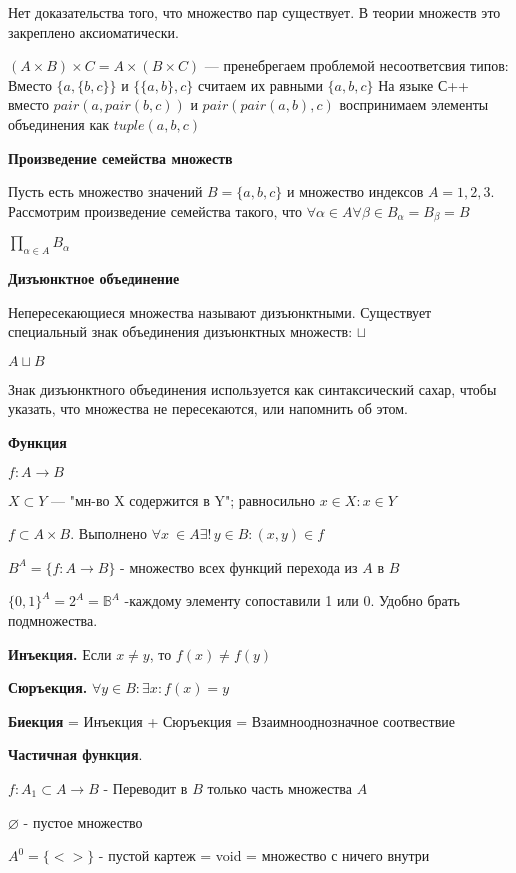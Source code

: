 \documentclass{article}
\begin{document}
Нет доказательства того, что множество пар существует. В теории множеств это закреплено аксиоматически.

$(A \times B) \times C = A \times (B \times C)$ --- пренебрегаем проблемой несоответсвия типов:
Вместо $\{a, \{b, c\}\}$ и $\{\{a, b\}, c\}$ считаем их равными $\{a, b, c\}$
На языке С++ вместо $pair(a, pair(b, c))$  и $pair(pair(a, b), c)$  воспринимаем элементы объединения как $tuple(a, b, c)$

\textbf{Произведение семейства множеств}

Пусть есть множество значений $B = \{a, b, c\}$  и множество индексов $A = {1, 2, 3}$. Рассмотрим произведение семейства такого, что $\forall \alpha \in A \forall \beta \in B_\alpha = B_\beta = B$

$\prod_{\alpha\in A}{B_\alpha}$

\textbf{Дизъюнктное объединение}

Непересекающиеся множества называют дизъюнктными. Существует специальный знак объединения дизъюнктных множеств: $\sqcup$ 

$A \sqcup B$

Знак дизъюнктного объединения используется как синтаксический сахар, чтобы указать, что множества не пересекаются, или напомнить об этом.

\textbf{Функция} 

$f:A \rightarrow B$

$X \subset Y$ --- "мн-во X содержится в Y"; равносильно $x \in X: x \in Y$

$f \subset A \times B$. Выполнено $\forall x\ \in A \exists!\,y \in B: (x,y) \in f$

$B^A = \{f:A \rightarrow B\}$ - множество всех функций перехода из $A$ в $B$

$\{0, 1\}^{A}=2^{A}=\mathbb{B}^{A}$ -каждому элементу сопоставили 1 или 0. Удобно брать подмножества.


\textbf{Инъекция.} Если $x \neq y$, то $f(x) \neq f(y)$

\textbf{Сюръекция.} $\forall y \in B: \exists x: f(x)=y$

\textbf{Биекция} = Инъекция + Сюръекция = Взаимнооднозначное соотвествие

\textbf{Частичная функция}. 

$f: A_1 \subset A \rightarrow B$ - Переводит в $B$ только часть множества $A$

$\varnothing$ - пустое множество

$A^0 = \{<>\}$ - пустой картеж = void = множество с ничего внутри
\end{document}
